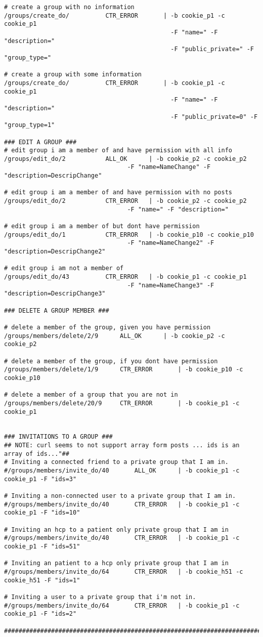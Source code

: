 \begin{verbatim}
# create a group with no information
/groups/create_do/ 			CTR_ERROR		| -b cookie_p1 -c cookie_p1 
                                              -F "name=" -F "description=" 
                                              -F "public_private=" -F "group_type="

# create a group with some information
/groups/create_do/ 			CTR_ERROR		| -b cookie_p1 -c cookie_p1 
                                              -F "name=" -F "description=" 
                                              -F "public_private=0" -F "group_type=1"

### EDIT A GROUP ###
# edit group i am a member of and have permission with all info
/groups/edit_do/2			ALL_OK		| -b cookie_p2 -c cookie_p2 
                                  -F "name=NameChange" -F "description=DescripChange"

# edit group i am a member of and have permission with no posts
/groups/edit_do/2			CTR_ERROR	| -b cookie_p2 -c cookie_p2 
                                  -F "name=" -F "description="

# edit group i am a member of but dont have permission
/groups/edit_do/1			CTR_ERROR	| -b cookie_p10 -c cookie_p10 
                                  -F "name=NameChange2" -F "description=DescripChange2"

# edit group i am not a member of
/groups/edit_do/43			CTR_ERROR	| -b cookie_p1 -c cookie_p1 
                                  -F "name=NameChange3" -F "description=DescripChange3"

### DELETE A GROUP MEMBER ###

# delete a member of the group, given you have permission
/groups/members/delete/2/9		ALL_OK		| -b cookie_p2 -c cookie_p2

# delete a member of the group, if you dont have permission
/groups/members/delete/1/9		CTR_ERROR		| -b cookie_p10 -c cookie_p10

# delete a member of a group that you are not in
/groups/members/delete/20/9		CTR_ERROR		| -b cookie_p1 -c cookie_p1


### INVITATIONS TO A GROUP ###
## NOTE: curl seems to not support array form posts ... ids is an array of ids..."##
# Inviting a connected friend to a private group that I am in. 
#/groups/members/invite_do/40		ALL_OK		| -b cookie_p1 -c cookie_p1 -F "ids=3"

# Inviting a non-connected user to a private group that I am in. 
#/groups/members/invite_do/40		CTR_ERROR	| -b cookie_p1 -c cookie_p1 -F "ids=10"

# Inviting an hcp to a patient only private group that I am in
#/groups/members/invite_do/40		CTR_ERROR	| -b cookie_p1 -c cookie_p1 -F "ids=51"

# Inviting an patient to a hcp only private group that I am in
#/groups/members/invite_do/64		CTR_ERROR	| -b cookie_h51 -c cookie_h51 -F "ids=1"

# Inviting a user to a private group that i'm not in.
#/groups/members/invite_do/64		CTR_ERROR	| -b cookie_p1 -c cookie_p1 -F "ids=2"

########################################################################
\end{verbatim}

